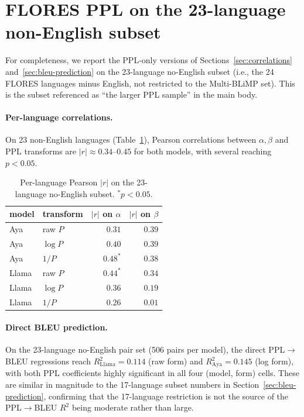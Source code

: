 \documentclass[11pt]{article}
\begin{document}
\section{FLORES PPL on the 23-language non-English subset}
\label{app:ppl-no-eng}

For completeness, we report the PPL-only versions of
Sections~\ref{sec:correlations} and~\ref{sec:bleu-prediction} on the
23-language no-English subset (i.e., the 24 FLORES languages minus
English, not restricted to the Multi-BLiMP set). This is the subset
referenced as ``the larger PPL sample'' in the main body.

\paragraph{Per-language correlations.}
On 23 non-English languages
(Table~\ref{tab:ppl-no-eng-corr}), Pearson correlations between $\alpha,
\beta$ and PPL transforms are $|r| \approx 0.34$--$0.45$ for both
models, with several reaching $p < 0.05$.

\begin{table}[h]
\centering
\small
\begin{tabular}{llrr}
\toprule
model & transform & $|r|$ on $\alpha$ & $|r|$ on $\beta$ \\
\midrule
Aya   & raw $P$  & $0.31$ & $0.39$ \\
Aya   & $\log P$ & $0.40$ & $0.39$ \\
Aya   & $1/P$    & $0.48^{*}$ & $0.38$ \\
Llama & raw $P$  & $0.44^{*}$ & $0.34$ \\
Llama & $\log P$ & $0.36$ & $0.19$ \\
Llama & $1/P$    & $0.26$ & $0.01$ \\
\bottomrule
\end{tabular}
\caption{Per-language Pearson $|r|$ on the 23-language no-English
subset. $^{*}p < 0.05$.}
\label{tab:ppl-no-eng-corr}
\end{table}

\paragraph{Direct BLEU prediction.}
On the 23-language no-English pair set (506 pairs per model), the
direct PPL$\to$BLEU regressions reach
$R^2_{\text{Llama}} = 0.114$ (raw form) and
$R^2_{\text{Aya}} = 0.145$ (log form), with both PPL coefficients
highly significant in all four (model, form) cells. These are similar
in magnitude to the 17-language subset numbers in
Section~\ref{sec:bleu-prediction}, confirming that the 17-language
restriction is not the source of the PPL$\to$BLEU $R^2$ being moderate
rather than large.
\end{document}
